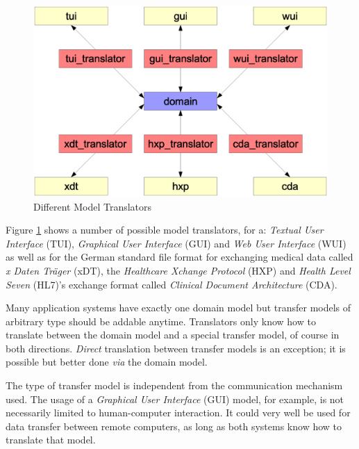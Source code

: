 \begin{figure}[ht]
    \begin{center}
        \includegraphics[scale=0.2]{vector/translators.eps}
        \caption{Different Model Translators}
        \label{translators_figure}
    \end{center}
\end{figure}

Figure \ref{translators_figure} shows a number of possible model translators,
for a: \emph{Textual User Interface} (TUI), \emph{Graphical User Interface}
(GUI) and \emph{Web User Interface} (WUI) as well as for the German standard
file format for exchanging medical data called \emph{x Daten Tr\"ager} (xDT),
the \emph{Healthcare Xchange Protocol} (HXP) and \emph{Health Level Seven}
(HL7)'s exchange format called \emph{Clinical Document Architecture} (CDA).

Many application systems have exactly one domain model but transfer models of
arbitrary type should be addable anytime. Translators only know how to
translate between the domain model and a special transfer model, of course in
both directions. \emph{Direct} translation between transfer models is an
exception; it is possible but better done \emph{via} the domain model.

The type of transfer model is independent from the communication mechanism
used. The usage of a \emph{Graphical User Interface} (GUI) model, for example,
is not necessarily limited to human-computer interaction. It could very well be
used for data transfer between remote computers, as long as both systems know
how to translate that model.
